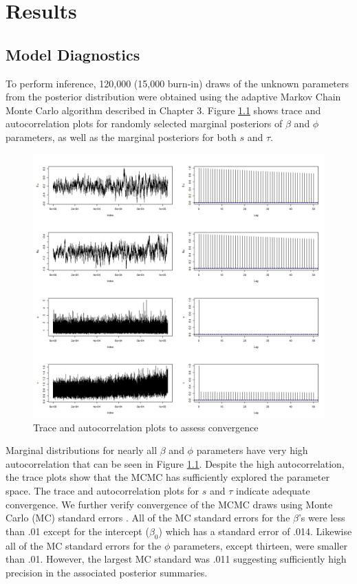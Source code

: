 \chapter{Results}

\section{Model Diagnostics}
To perform inference, 120,000 (15,000 burn-in) draws of the unknown parameters from the posterior distribution were obtained using the adaptive Markov Chain Monte Carlo algorithm described in Chapter 3. Figure \ref{diagnostics} shows trace and autocorrelation plots for randomly selected marginal posteriors of $\beta$ and $\phi$ parameters, as well as the marginal posteriors for both $s$ and $\tau$. 
\begin{figure}[bt]
\centering
\includegraphics[width=.70\textwidth]{diagnostics.jpeg}
\caption{Trace and autocorrelation plots to assess convergence}
\label{diagnostics}
\end{figure}

Marginal distributions for nearly all $\beta$ and $\phi$ parameters have very high autocorrelation that can be seen in Figure \ref{diagnostics}. Despite the high autocorrelation, the trace plots show that the MCMC has sufficiently explored the parameter space. The trace and autocorrelation plots for $s$ and $\tau$ indicate adequate convergence. We further verify convergence of the MCMC draws using Monte Carlo (MC) standard errors \citep{jones06}. All of the MC standard errors for the $\beta$'s were less than .01 except for the intercept ($\beta_0$) which has a standard error of .014.   Likewise all of the MC standard errors for the $\phi$ parameters, except thirteen, were smaller than .01. However, the largest MC standard was .011 suggesting sufficiently high precision in the associated posterior summaries.

